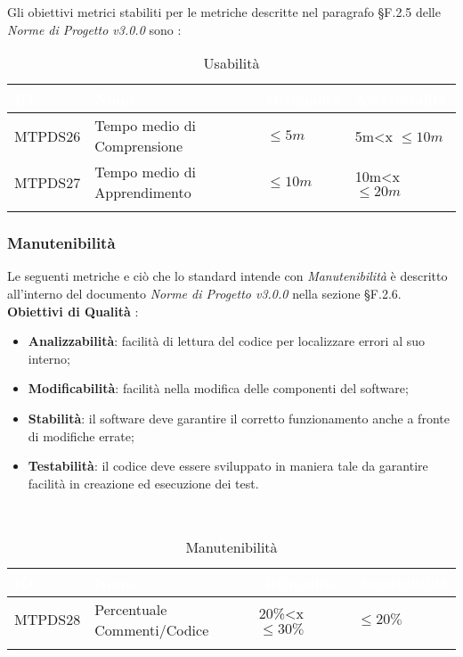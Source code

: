 Gli obiettivi metrici stabiliti per le metriche descritte nel paragrafo §F.2.5 delle \textit{Norme di Progetto v3.0.0} sono : 

\begin{longtable}{|C{.15\textwidth}|C{.24\textwidth}|C{.24\textwidth}|C{.24\textwidth}|}
\hline
{}\textbf{\textcolor{white}{ID}} & \textbf{\textcolor{white}{Nome}} & \textbf{\textcolor{white}{Ottimalità}} & \textbf{\textcolor{white}{Accettabilità}}\\
\hline
MTPDS26 & Tempo medio di Comprensione & $\leq 5m$ & 5m<x $\leq 10m$\\
\hline
{}MTPDS27 & Tempo medio di Apprendimento & $\leq 10m$ & 10m<x $\leq 20m$ \\ 
\hline
\caption{Usabilità}
\label{Usabilità}
\end{longtable}

\subsubsection{Manutenibilità}

Le seguenti metriche e ciò che lo standard intende con \textit{Manutenibilità} è descritto all'interno del documento \textit{Norme di Progetto v3.0.0} nella sezione §F.2.6. \\

\textbf{Obiettivi di Qualità} :

\begin{itemize}
	\item \textbf{Analizzabilità}: facilità di lettura del codice per localizzare errori al suo interno; 
	\item \textbf{Modificabilità}: facilità nella modifica delle componenti del software;
	\item \textbf{Stabilità}: il software deve garantire il corretto funzionamento anche a fronte di modifiche errate;
	\item \textbf{Testabilità}: il codice deve essere sviluppato in maniera tale da garantire facilità in creazione ed esecuzione dei test.
\end{itemize}
\-\\
\begin{longtable}{|C{.15\textwidth}|C{.24\textwidth}|C{.24\textwidth}|C{.24\textwidth}|}
\hline
{}\textbf{\textcolor{white}{ID}} & \textbf{\textcolor{white}{Nome}} & \textbf{\textcolor{white}{Ottimalità}} & \textbf{\textcolor{white}{Accettabilità}}\\
\hline
MTPDS28 & Percentuale Commenti/Codice & 20\%<x $\leq 30\%$ & $\leq 20\%$\\
\hline

\caption{Manutenibilità}
\label{Manutenibilità}
\end{longtable}

